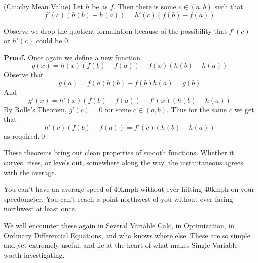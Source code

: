 \begin{SNP}{\thm}{(Cauchy Mean Value) Let $h$ be as $f$. Then there is some $c \in (a, b)$ such that
$$
f'(c)(h(b) - h(a)) = h'(c)(f(b) - f(a))
$$}
\end{SNP}
Observe we drop the quotient formulation because of the possibility that $f'(c)$ or $h'(c)$ could be $0$.
\begin{smrg}\textbf{Proof.} Once again we define a new function
$$
g(x) = h(x)(f(b) - f(a)) - f(x)(h(b) - h(a))
$$
Observe that
$$
g(a) = f(a)h(b) - f(b)h(a) = g(b)
$$
And
$$
g'(x) = h'(x)(f(b) - f(a)) - f'(x)(h(b) - h(a))
$$
By Rolle's Theorem, $g'(c) = 0$ for some $c \in (a, b)$. Thus for the same $c$ we get that
$$
h'(c)(f(b) - f(a)) = f'(c)(h(b) - h(a))
$$
as required.\qed
\end{smrg}

These theorems bring out clean properties of smooth functions. Whether it curves, rises, or levels out, somewhere along the way, the instantaneous agrees with the average.

You can't have an average speed of $40$kmph without ever hitting $40$kmph on your speedometer. You can't reach a point northwest of you without ever facing northwest at least once.

We will encounter these again in Several Variable Calc, in Optimization, in Ordinary Differential Equations, and who knows where else. These are so simple and yet extremely useful, and lie at the heart of what makes Single Variable worth investigating.
